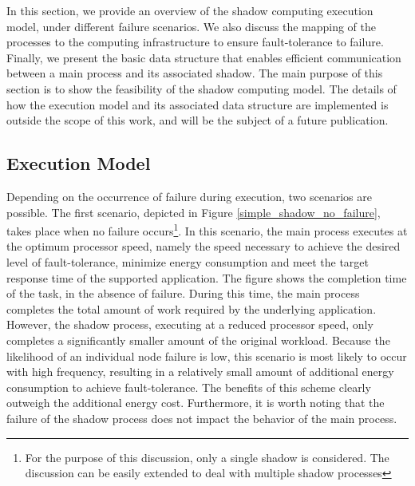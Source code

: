 
In this section, we provide an overview of the shadow computing
execution model, under different failure scenarios. We also discuss
the mapping of the processes to the computing infrastructure to ensure
fault-tolerance to failure. Finally, we present the basic data
structure that enables efficient communication between a main process
and its associated shadow. The main purpose of this section is to show
the feasibility of the shadow computing model. The details of how the
execution model and its associated data structure are implemented is
outside the scope of this work, and will be the subject of a future
publication.


\subsection{Execution Model} 

Depending on the occurrence of failure during execution, two scenarios
are possible. The first scenario, depicted in Figure
\ref{simple_shadow_no_failure}, takes place when no failure
occurs\footnote{For the purpose of this discussion, only a single
shadow is considered. The discussion can be easily extended to deal
with multiple shadow processes}. In this scenario, the main process
executes at the optimum processor speed, namely the speed necessary to
achieve the desired level of fault-tolerance, minimize energy
consumption and meet the target response time of the supported
application. The figure shows the completion time of the task, in the
absence of failure. During this time, the main process completes the
total amount of work required by the underlying application. However,
the shadow process, executing at a reduced processor speed, only
completes a significantly smaller amount of the original workload.
Because the likelihood of an individual node failure is low, this
scenario is most likely to occur with high frequency, resulting in a
relatively small amount of additional energy consumption to achieve
fault-tolerance. The benefits of this scheme clearly outweigh the
additional energy cost. Furthermore, it is worth noting that the
failure of the shadow process does not impact the behavior of the main
process.

\begin{figure}[hHtb]
\centering
{}
\end{figure}

